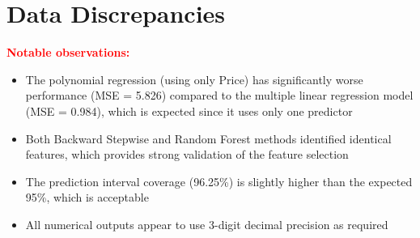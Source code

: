\documentclass[11pt]{article}
\begin{document}
\section{Data Discrepancies}

\textcolor{red}{\textbf{Notable observations:}}

\begin{itemize}
    \item The polynomial regression (using only Price) has significantly worse performance (MSE = 5.826) compared to the multiple linear regression model (MSE = 0.984), which is expected since it uses only one predictor
    \item Both Backward Stepwise and Random Forest methods identified identical features, which provides strong validation of the feature selection
    \item The prediction interval coverage (96.25\%) is slightly higher than the expected 95\%, which is acceptable
    \item All numerical outputs appear to use 3-digit decimal precision as required
\end{itemize}
\end{document}
